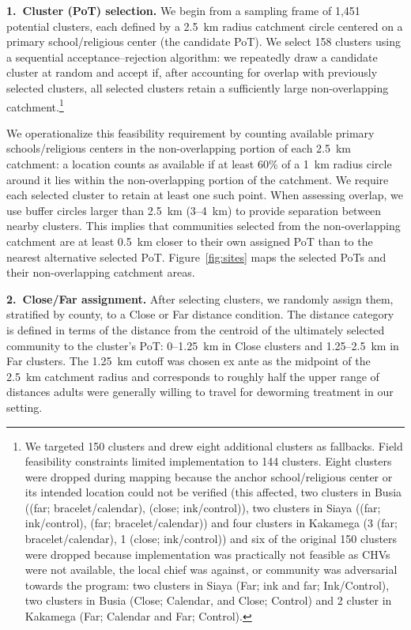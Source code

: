 \vspace{0.4em}
\noindent\textbf{1.\ Cluster (PoT) selection.} We begin from a sampling frame of 1{,}451 potential clusters, each defined by a 2.5~km radius catchment circle centered on a primary school/religious center (the candidate PoT). We select 158 clusters using a sequential acceptance--rejection algorithm: we repeatedly draw a candidate cluster at random and accept if, after accounting for overlap with previously selected clusters, all selected clusters retain a sufficiently large non-overlapping catchment.\footnote{We targeted 150 clusters and drew eight additional clusters as fallbacks. Field feasibility constraints limited implementation to 144 clusters. Eight clusters were dropped during mapping because the anchor school/religious center or its intended location could not be verified (this affected, two clusters in Busia ((far; bracelet/calendar), (close; ink/control)), two clusters in Siaya ((far; ink/control), (far; bracelet/calendar)) and four clusters in Kakamega (3 (far; bracelet/calendar), 1 (close; ink/control)) and six of the original 150 clusters were dropped because implementation was practically not feasible as CHVs were not available, the local chief was against, or community was adversarial towards the program: two clusters in Siaya (Far; ink and far; Ink/Control), two clusters in Busia (Close; Calendar, and Close; Control) and 2 cluster in Kakamega (Far; Calendar and Far; Control).} %

We operationalize this feasibility requirement by counting available primary schools/religious centers in the non-overlapping portion of each 2.5~km catchment: a location counts as available if at least 60\% of a 1~km radius circle around it lies within the non-overlapping portion of the catchment. We require each selected cluster to retain at least one such point. When assessing overlap, we use buffer circles larger than 2.5~km (3--4~km) to provide separation between nearby clusters. This implies that communities selected from the non-overlapping catchment are at least 0.5~km closer to their own assigned PoT than to the nearest alternative selected PoT. Figure~\ref{fig:sites} maps the selected PoTs and their non-overlapping catchment areas.

\vspace{0.4em}
\noindent\textbf{2.\ Close/Far assignment.}
After selecting clusters, we randomly assign them, stratified by county, to a Close or Far distance condition. The distance category is defined in terms of the distance from the centroid of the ultimately selected community to the cluster's PoT: 0--1.25~km in Close clusters and 1.25--2.5~km in Far clusters. The 1.25~km cutoff was chosen ex ante as the midpoint of the 2.5~km catchment radius and corresponds to roughly half the upper range of distances adults were generally willing to travel for deworming treatment in our setting.

